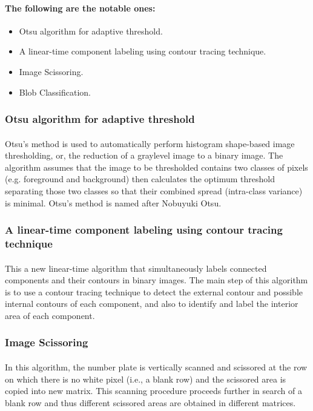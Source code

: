 \documentclass[a4paper,10pt]{iesreport}
\begin{document}
\paragraph*{The  following are the notable ones:}
\begin{itemize}
 \item Otsu algorithm for adaptive threshold.
 \item A linear-time component labeling using contour tracing technique.
 \item Image Scissoring.
 \item Blob Classification.
\end{itemize}
\subsubsection*{Otsu algorithm for adaptive threshold}
\paragraph*{}
Otsu's method is used to automatically perform histogram shape-based image thresholding, or, the reduction of a graylevel image to a binary image.
The algorithm assumes that the image to be thresholded contains two classes of pixels (e.g. foreground and background) then calculates the optimum threshold separating those two classes so that their 
combined spread (intra-class variance) is minimal. Otsu's method is named after Nobuyuki Otsu. \cite{OT}


\subsubsection*{A linear-time component labeling using contour tracing technique}
\paragraph*{}
This a new linear-time algorithm that simultaneously labels connected components and their contours in binary images. The main step of this algorithm is to use a contour tracing technique to detect the external contour and possible internal contours of each component, 
and also to identify and label the interior area of each component. \cite{LT}
\subsubsection*{Image Scissoring}
\paragraph*{}
In this algorithm, the number plate is vertically scanned
 and scissored at the row on which there is no white
 pixel (i.e., a blank row) and the scissored area is
 copied into new matrix. This scanning procedure
 proceeds further in search of a blank row and thus
 different scissored areas are obtained in different
  matrices. 
\cite{IS}
\end{document}
